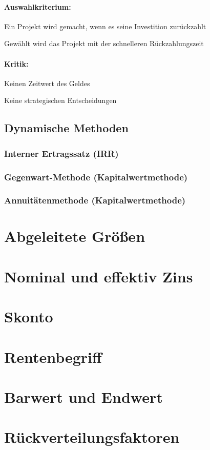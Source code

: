 \paragraph{Auswahlkriterium:}
\begin{compactitem}
	\item Ein Projekt wird gemacht, wenn es seine Investition zurückzahlt
	\item Gewählt wird das Projekt mit der schnelleren Rückzahlungszeit
\end{compactitem}

\paragraph{Kritik:}
\begin{compactitem}
	\item Keinen Zeitwert des Geldes
	\item Keine strategischen Entscheidungen
\end{compactitem}



\clearpage
\subsection{Dynamische Methoden}
\clearpage
\subsubsection{Interner Ertragssatz (IRR)}

\clearpage
\subsubsection{Gegenwart-Methode (Kapitalwertmethode)}

\clearpage
\subsubsection{Annuitätenmethode (Kapitalwertmethode)}

\section{Abgeleitete Größen}
\section{Nominal und effektiv Zins}
\section{Skonto}
\section{Rentenbegriff}
\section{Barwert und Endwert}
\section{Rückverteilungsfaktoren}